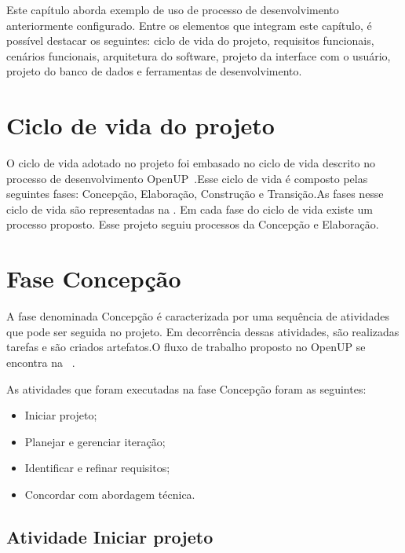 Este capítulo aborda exemplo de uso de processo de desenvolvimento anteriormente configurado. Entre os elementos que integram este capítulo, é possível destacar os seguintes: ciclo de vida do projeto, requisitos funcionais, cenários funcionais, arquitetura do software, projeto da interface com o usuário, projeto do banco de dados e ferramentas de desenvolvimento.


\section{Ciclo de vida do projeto}
O ciclo de vida adotado no projeto foi embasado no ciclo de vida descrito no processo de desenvolvimento  OpenUP~\cite{openup}.Esse ciclo de vida é composto pelas seguintes fases: Concepção, Elaboração, Construção e Transição.As fases nesse ciclo de vida são representadas na . Em cada fase do ciclo de vida existe um processo proposto. Esse projeto seguiu processos da Concepção e  Elaboração.

%

\section{Fase Concepção}

A fase denominada Concepção é caracterizada por uma sequência de atividades que pode ser seguida no projeto. Em decorrência dessas atividades, são realizadas tarefas e são criados artefatos.O fluxo de trabalho proposto no OpenUP se encontra na ~.

%

As atividades que foram executadas na fase Concepção foram as seguintes:
\begin{itemize}
    \item Iniciar projeto;
    \item Planejar e gerenciar iteração;
    \item Identificar e refinar requisitos;
    \item Concordar com abordagem técnica.
\end{itemize}

\subsection{Atividade Iniciar projeto}

